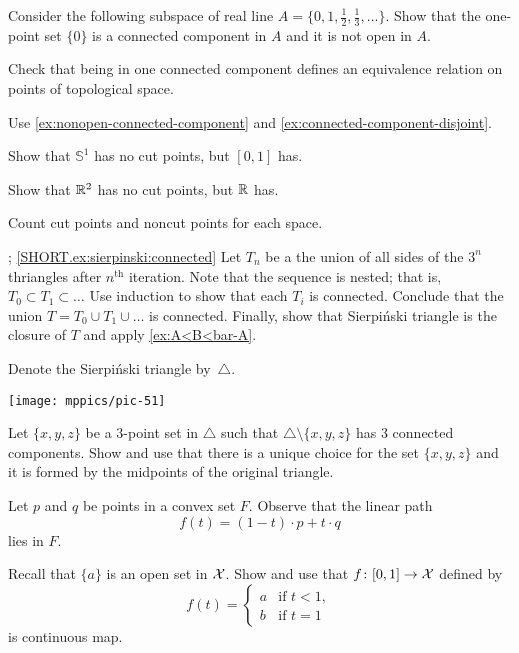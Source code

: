 \begin{multicols}{2}
Consider the following subspace of real line $A=\{0,1,\tfrac12,\tfrac13,\dots\}$.
Show that the one-point set $\{0\}$ is a connected component in $A$ and it is not open in $A$. 

Check that being in one connected component defines an equivalence relation on points of topological space.

Use \ref{ex:nonopen-connected-component} and \ref{ex:connected-component-disjoint}.

Show that $\mathbb{S}^1$ has no cut points, but $[0,1]$ has.

Show that $\mathbb{R}^2$ has no cut points, but $\mathbb{R}$ has.

Count cut points and noncut points for each space.

\parbf{\ref{ex:sierpinski}};
\ref{SHORT.ex:sierpinski:connected}
Let $T_n$ be a the union of all sides of the $3^n$ thriangles after $n^{\text{th}}$ iteration.
Note that the sequence is nested; that is, $T_0\subset T_1\subset \dots{}$
Use induction to show that each $T_i$ is connected.
Conclude that the union $T=T_0\cup T_1\cup\dots$ is connected.
Finally, show that Sierpi\'nski triangle is the closure of $T$ and apply \ref{ex:A<B<bar-A}.

Denote the Sierpi\'nski triangle by~$\triangle$.

\begin{Figure}
\vskip-0mm
\centering
\texttt{[image: mppics/pic-51]}
\end{Figure}

Let $\{x,y,z\}$ be a 3-point set in $\triangle$ such that $\triangle \setminus\{x,y,z\}$ has 3 connected components.
Show and use that there is a unique choice for the set $\{x,y,z\}$ and 
it is formed by the midpoints of the original triangle.

Let $p$ and $q$ be points in a convex set $F$.
Observe that the linear path 
\[f(t)=(1-t)\cdot p+t\cdot q\]
lies in $F$.

Recall that $\{a\}$ is an open set in $\mathcal{X}$.
Show and use that $f\colon[0,1]\to\mathcal{X}$ defined by 
\[f(t)=
\begin{cases}
a&\text{if\ }t<1,
\\
b&\text{if\ }t=1
\end{cases}
\]
is continuous map.


\end{multicols}
